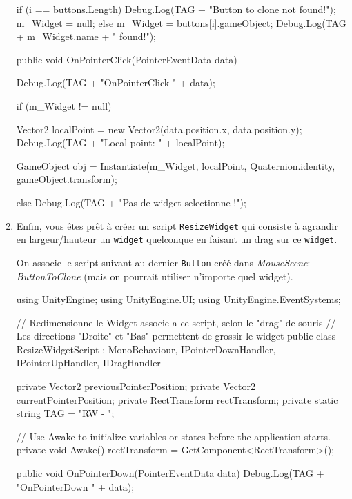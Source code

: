 \documentclass[a4paper,10pt]{article}
\newenvironment{solution}%
{\begin{tcolorbox}[breakable,colback=red!5!white,colframe=red!75!black,title=Solution]}%
{\end{tcolorbox}}
\newenvironment{boxcode}%
{\begin{tcolorbox}[breakable,colback=gray!5!white,colframe=black]}%
	{\end{tcolorbox}}
\begin{document}
\begin{enumerate}
\begin{solution}
\begin{boxcode}
\begin{csharpsansbord}
{{{			if (i == buttons.Length) {
				Debug.Log(TAG + "Button to clone not found!");
				m_Widget = null;
			}
			else {
				m_Widget = buttons[i].gameObject;
				Debug.Log(TAG + m_Widget.name + " found!");				
			}
		}
	}
	
	public void OnPointerClick(PointerEventData data)
	{
		Debug.Log(TAG + "OnPointerClick " + data);		
		
		if (m_Widget != null) {
			Vector2 localPoint = new Vector2(data.position.x, data.position.y);
			Debug.Log(TAG + "Local point: " + localPoint);
			
			GameObject obj = Instantiate(m_Widget,
			localPoint,
			Quaternion.identity,
			gameObject.transform);
		}
		else {
			Debug.Log(TAG + "Pas de widget selectionne !");
		}
	}
}

\end{csharpsansbord}
\end{boxcode}

\end{solution}	
\fi 
		
	
	\item Enfin, vous êtes prêt à créer un script \texttt{ResizeWidget} qui consiste à agrandir en largeur/hauteur un \texttt{widget} quelconque en faisant un drag sur ce \texttt{widget}.
	
\ifversionenseignant
\begin{solution}
On associe le script suivant au dernier \texttt{Button} créé dans \textit{MouseScene}: \textit{ButtonToClone} (mais on pourrait utiliser n'importe quel widget).
	
\begin{boxcode}
\begin{csharpsansbord}
using UnityEngine;
using UnityEngine.UI;
using UnityEngine.EventSystems;

// Redimensionne le Widget associe a ce script, selon le "drag" de souris
// Les directions "Droite" et "Bas" permettent de grossir le widget
public class ResizeWidgetScript : MonoBehaviour, IPointerDownHandler,
   IPointerUpHandler, IDragHandler
{
	private Vector2 previousPointerPosition;
	private Vector2 currentPointerPosition;
	private RectTransform rectTransform;
	private static string TAG = "RW - ";
	
	// Use Awake to initialize variables or states before the application starts.	
	private void Awake() { rectTransform = GetComponent<RectTransform>(); }
	
	public void OnPointerDown(PointerEventData data) {
		Debug.Log(TAG + "OnPointerDown " + data);
	}
	
}
\end{csharpsansbord}
\end{boxcode}
\end{solution}
\end{enumerate}
\end{document}
